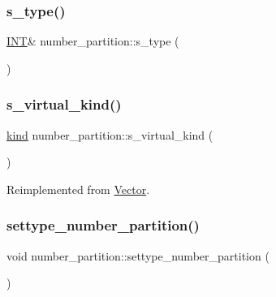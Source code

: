 \mbox{\label{classnumber__partition_a65f10dc2af06748e5142bbb7979cbc96}} 
\subsubsection{\texorpdfstring{s\+\_\+type()}{s\_type()}}
{\footnotesize\ttfamily \mbox{\hyperlink{galois_8h_a09fddde158a3a20bd2dcadb609de11dc}{I\+NT}}\& number\+\_\+partition\+::s\+\_\+type (\begin{DoxyParamCaption}{ }\end{DoxyParamCaption})\hspace{0.3cm}{\ttfamily [inline]}}

\mbox{\label{classnumber__partition_aaa88b590321ba25867fb1c70451c629a}} 
\subsubsection{\texorpdfstring{s\+\_\+virtual\+\_\+kind()}{s\_virtual\_kind()}}
{\footnotesize\ttfamily \mbox{\hyperlink{discreta_8h_aaf25ee7e2306d78c74ec7bc48f092e81}{kind}} number\+\_\+partition\+::s\+\_\+virtual\+\_\+kind (\begin{DoxyParamCaption}{ }\end{DoxyParamCaption})\hspace{0.3cm}{\ttfamily [virtual]}}



Reimplemented from \mbox{\hyperlink{class_vector_a20550e70d02cbe484032c7f6b0833a0f}{Vector}}.

\mbox{\label{classnumber__partition_a3aaec1b557758f643ffc8555bbc358be}} 
\subsubsection{\texorpdfstring{settype\+\_\+number\+\_\+partition()}{settype\_number\_partition()}}
{\footnotesize\ttfamily void number\+\_\+partition\+::settype\+\_\+number\+\_\+partition (\begin{DoxyParamCaption}{ }\end{DoxyParamCaption})}

